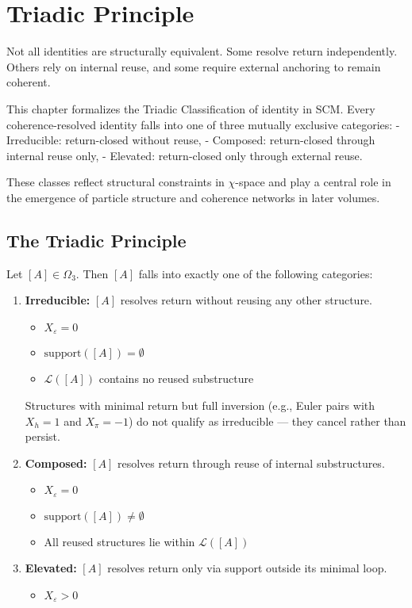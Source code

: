 \chapter{Triadic Principle}

Not all identities are structurally equivalent. Some resolve return
independently. Others rely on internal reuse, and some require external
anchoring to remain coherent.

This chapter formalizes the Triadic Classification of identity in SCM.
Every coherence-resolved identity falls into one of three mutually
exclusive categories:
- Irreducible: return-closed without reuse,
- Composed: return-closed through internal reuse only,
- Elevated: return-closed only through external reuse.

These classes reflect structural constraints in $\chi$-space and play a
central role in the emergence of particle structure and coherence
networks in later volumes.

\section{The Triadic Principle} \label{the-triadic-principle}

Let $[A] \in \Omega_3$. Then $[A]$ falls into exactly one of the following categories:

\begin{enumerate}
  \item \textbf{Irreducible:}  
  $[A]$ resolves return without reusing any other structure.

  \begin{itemize}
    \item $X_\varepsilon = 0$
    \item $\text{support}([A]) = \emptyset$
    \item $\mathcal{L}([A])$ contains no reused substructure
  \end{itemize}

  Structures with minimal return but full inversion (e.g., Euler pairs with $X_h = 1$ and $X_\pi = -1$) do not qualify as irreducible — they cancel rather than persist.

  \item \textbf{Composed:}  
  $[A]$ resolves return through reuse of internal substructures.

  \begin{itemize}
    \item $X_\varepsilon = 0$
    \item $\text{support}([A]) \ne \emptyset$
    \item All reused structures lie within $\mathcal{L}([A])$
  \end{itemize}

  \item \textbf{Elevated:}  
  $[A]$ resolves return only via support outside its minimal loop.

  \begin{itemize}
    \item $X_\varepsilon > 0$
  \end{itemize}
\end{enumerate}

